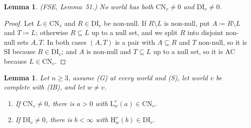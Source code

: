 \documentclass[11pt]{article}
\newtheorem{lemma}[theorem]{Lemma}
\theoremstyle{definition}\newtheorem{definition}[theorem]{Definition}
\theoremstyle{remark}\newtheorem{remark}[theorem]{Remark}
\newcommand{\Lo}[3]{\mathrm L^{#1}_{#2}(#3)}
\newcommand{\Hi}[3]{\mathrm H^{#1}_{#2}(#3)}
\newcommand{\CN}{\mathrm{CN}}
\newcommand{\DI}{\mathrm{DI}}
\begin{document}
\begin{lemma}\label{lem:excl}
(FSE, Lemma~51.) No world has both $\CN_v\ne0$ and $\DI_v\ne0$.
\end{lemma}
\begin{proof}
Let $L\in\CN_v$ and $R\in\DI_v$ be non-null. If $R\setminus L$ is
non-null, put $A\coloneqq R\setminus L$ and $T\coloneqq L$; otherwise
$R\subseteq L$ up to a null set, and we split $R$ into disjoint non-null
sets $A,T$. In both cases $(A,T)$ is a pair with $A\subseteq R$ and $T$
non-null, so it is SI because $R\in\DI_v$; and $A$ is non-null and
$T\subseteq L$ up to a null set, so it is AC because $L\in\CN_v$.
\end{proof}

\begin{lemma}\label{lem:conestails}
Let $n\ge3$, assume (G) at every world and (S), let world $v$ be complete
with (IB), and let $w\ne v$.
\begin{enumerate}[label=(\alph*),leftmargin=*,itemsep=2pt]
\item If $\CN_v\ne0$, there is $a>0$ with $\Lo vwa\in\CN_v$.
\item If $\DI_v\ne0$, there is $b<\infty$ with $\Hi vwb\in\DI_v$.
\end{enumerate}
\end{lemma}
\end{document}
